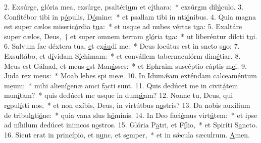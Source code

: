 2. Exsúrge, glória mea, exsúrge, psaltéri\uline{u}m et c\uline{í}thara:~* exsúrgm dil\uline{ú}culo.
3. Confitébor tibi in p\uline{ó}pulis, D\uline{ó}mine:~* et psallam tibi in nti\uline{ó}nibus.
4. Quia magna est super cælos miseric\uline{ó}rdia t\uline{u}a:~* et usque ad nubes vértas t\uline{u}a:
5. Exaltáre super cælos, Deus,~† et super omnem terram gl\uline{ó}ria t\uline{u}a:~* ut liberéntur dilcti t\uline{u}i.
6. Salvum fac déxtera tua, \uline{e}t ex\uline{áu}di me:~* Deus locútus est in sncto s\uline{u}o:
7. Exsultábo, et d\uline{í}vidam S\uline{í}chimam:~* et convállem tabernaculórm dim\uline{é}tiar.
8. Meus est Gálaad, et meus \uline{e}st Man\uline{á}sses:~* et Ephraim suscéptio cáptis m\uline{e}i.
9. J\uline{u}da rex m\uline{e}us:~* Moab lebes spi m\uline{e}æ.
10. In Idumǽam exténdam calceam\uline{é}ntum m\uline{e}um:~* mihi alienígenæ amci f\uline{a}cti sunt.
11. Quis dedúcet me in civit\uline{á}tem mun\uline{í}tam?~* quis dedúcet me usque in dum\uline{ǽ}am?
12. Nonne tu, Deus, qui r\uline{e}pul\uline{í}sti nos,~* et non exíbis, Deus, in virtútbus n\uline{o}stris?
13. Da nobis auxílium de tribul\uline{a}ti\uline{ó}ne:~* quia vana slus h\uline{ó}minis.
14. In Deo faci\uline{é}mus virt\uline{ú}tem:~* et ipse ad níhilum dedúcet inimcos n\uline{o}stros.
15. Glória P\uline{a}tri, et F\uline{í}lio,~* et Spiríti S\uline{a}ncto.
16. Sicut erat in princípio, et n\uline{u}nc, et s\uline{e}mper,~* et in sǽcula sæculrum. \uline{A}men.

